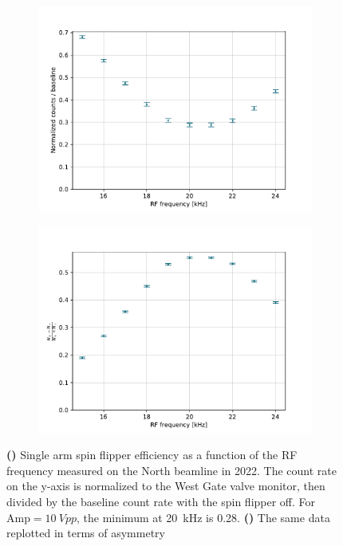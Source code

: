 \begin{figure}
\centering
\begin{subfigure}{.5\textwidth} 
  \centering
  \includegraphics[width=\textwidth]{figures/2022_single_arm_spin_flip_eff.pdf}
  \caption{}\label{subfig:2022_single_arm_eff}
\end{subfigure}%
\begin{subfigure}{.5\textwidth}
  \centering
  \includegraphics[width=\textwidth]{figures/2022_single_arm_spin_flip_asymmetry.pdf}
  \caption{}\label{subfig:2022_single_arm_asym}
\end{subfigure}
\caption
    {\textbf{()} Single arm spin flipper efficiency as a function of the RF frequency measured on the North beamline in 2022. The count rate on the y-axis is normalized to the West Gate valve monitor, then divided by the baseline count rate with the spin flipper off. For $\text{Amp}=\qty{10}{Vpp}$, the minimum at \qty{20}{kHz} is 0.28. \textbf{()} The same data replotted in terms of asymmetry}
\label{fig:2022_single_arm_asymmetry}
\end{figure}

